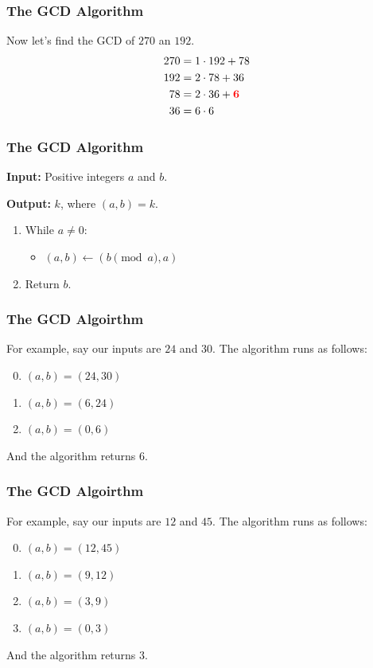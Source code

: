 \documentclass{beamer}
\newcommand{\<}{\langle}
\renewcommand{\>}{\rangle}
\begin{document}
\begin{frame}
\frametitle{The GCD Algorithm}

Now let's find the GCD of $270$ an $192$.
\begin{align*}
270 &= 1\cdot 192 + 78\\
192 &= 2\cdot 78 + 36\\
78 &= 2\cdot 36 + {\color{red}\mathbf{6}}\\
36 &= 6\cdot 6
\end{align*}
\end{frame}


\begin{frame}
\frametitle{The GCD Algorithm}

\textbf{Input:} Positive integers $a$ and $b$.

\textbf{Output:} $k$, where $(a, b) = k$.

\begin{enumerate}[(1)]
\item  While $a \ne 0$:
	\begin{itemize}
	\item $(a,b) \leftarrow (b\pmod a, a)$
	\end{itemize}
\item Return $b$.
\end{enumerate}
\end{frame}


\begin{frame}
\frametitle{The GCD Algoirthm}

For example, say our inputs are $24$ and $30$. The algorithm runs as follows:
\begin{enumerate}[Loop 1:]
\setcounter{enumi}{-1}
\item $(a, b) = (24, 30)$
\item $(a, b) = (6, 24)$
\item $(a, b) = (0, 6)$
\end{enumerate}
And the algorithm returns $6$.
\end{frame}


\begin{frame}
\frametitle{The GCD Algoirthm}

For example, say our inputs are $12$ and $45$. The algorithm runs as follows:
\begin{enumerate}[Loop 1:]
\setcounter{enumi}{-1}
\item $(a, b) = (12, 45)$
\item $(a, b) = (9, 12)$
\item $(a, b) = (3, 9)$
\item $(a, b) = (0, 3)$
\end{enumerate}
And the algorithm returns $3$.
\end{frame}
\end{document}
